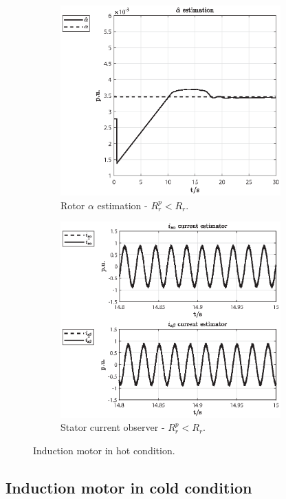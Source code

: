 \documentclass[11pt,a4paper,oneside]{book}
\numberwithin{equation}{section}
\theoremstyle{it}
\theoremstyle{definition}
\begin{document}
\begin{figure}[H]
	\centering
	\begin{subfigure}{0.5\textwidth}
	\centering
	\includegraphics[width = 240pt, keepaspectratio]{figures/sim_results/hot_condition/alpha_est.eps}
	\captionsetup{width=0.65\textwidth, font=footnotesize}	
	\caption{Rotor ${\alpha}$ estimation - $R_r^p < R_r$.}
	\label{fig_sim_res_17}
	\end{subfigure}%
	\begin{subfigure}{0.5\textwidth}
	\centering
	\includegraphics[width = 240pt, keepaspectratio]{figures/sim_results/hot_condition/current_obs.eps}
	\captionsetup{width=0.65\textwidth, font=footnotesize}	
	\caption{Stator current observer - $R_r^p < R_r$.}
	\label{fig_sim_res_18}
	\end{subfigure}		
	\captionsetup{width=0.5\textwidth, font=small}		
	\caption{Induction motor in hot condition.}
	\label{}
\end{figure}

\subsection{Induction motor in cold condition}
\end{document}
